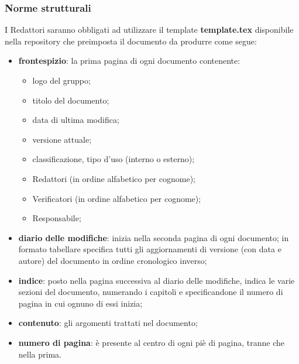 	\subsubsection{Norme strutturali}
	I Redattori saranno obbligati ad utilizzare il template \textbf{template.tex} disponibile nella repository che preimposta il documento da produrre come segue:
	\begin{itemize}
		\item \textbf{frontespizio}: la prima pagina di ogni documento contenente:
			\begin{itemize}
				\item logo del gruppo;
				\item titolo del documento;
				\item data di ultima modifica;
				\item versione attuale;
				\item classificazione, tipo d'uso (interno o esterno);
				\item Redattori (in ordine alfabetico per cognome);
				\item Verificatori (in ordine alfabetico per cognome);
				\item Responsabile;
			\end{itemize}
		\item \textbf{diario delle modifiche}: inizia nella seconda pagina di ogni documento; in formato tabellare specifica tutti gli aggiornamenti di versione (con data e autore) del documento in ordine cronologico inverso;
		\item \textbf{indice}: posto nella pagina successiva al diario delle modifiche, indica le varie sezioni del documento, numerando i capitoli e specificandone il numero di pagina in cui ognuno di essi inizia;
		\item \textbf{contenuto}: gli argomenti trattati nel documento;
		\item \textbf{numero di pagina}: è presente al centro di ogni piè di pagina, tranne che nella prima.
	\end{itemize}
		
